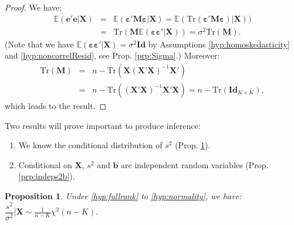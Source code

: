 \documentclass[
  11pt,
]{book}
\providecommand{\tightlist}{%
  \setlength{\itemsep}{0pt}\setlength{\parskip}{0pt}}
\newtheorem{proposition}{Proposition}[chapter]
\theoremstyle{definition}
\theoremstyle{definition}
\theoremstyle{definition}
\theoremstyle{definition}
\theoremstyle{remark}
\begin{document}
\begin{proof}
We have:
\begin{eqnarray*}
\mathbb{E}(\mathbf{e}'\mathbf{e}|\mathbf{X})&=&\mathbb{E}(\boldsymbol{\varepsilon}'\mathbf{M}\boldsymbol{\varepsilon}|\mathbf{X})=\mathbb{E}(\mbox{Tr}(\boldsymbol{\varepsilon}'\mathbf{M}\boldsymbol{\varepsilon})|\mathbf{X}))\\
&=&\mbox{Tr}(\mathbf{M}\mathbb{E}(\boldsymbol{\varepsilon}\boldsymbol{\varepsilon}'|\mathbf{X}))=\sigma^2 \mbox{Tr}(\mathbf{M}).
\end{eqnarray*}
(Note that we have \(\mathbb{E}(\boldsymbol{\varepsilon}\boldsymbol{\varepsilon}'|\mathbf{X})=\sigma^2\mathbf{Id}\) by Assumptions \ref{hyp:homoskedasticity} and \ref{hyp:noncorrelResid}, see Prop. \ref{prp:Sigma}.) Moreover:
\begin{eqnarray*}
\mbox{Tr}(\mathbf{M})&=&n-\mbox{Tr}(\mathbf{X}(\mathbf{X}'\mathbf{X})^{-1}\mathbf{X}')\\
&=&n-\mbox{Tr}((\mathbf{X}'\mathbf{X})^{-1}\mathbf{X}'\mathbf{X})=n-\mbox{Tr}(\mathbf{Id}_{K \times K}),
\end{eqnarray*}
which leads to the result.
\end{proof}

Two results will prove important to produce inference:

\begin{enumerate}
\def\labelenumi{\roman{enumi}.}
\tightlist
\item
  We know the conditional distribution of \(s^2\) (Prop. \ref{prp:s2distri}).
\item
  Conditional on \(\mathbf{X}\), \(s^2\) and \(\mathbf{b}\) are independent random variables (Prop. \ref{prp:indeps2b}).
\end{enumerate}

\begin{proposition}
\protect\hypertarget{prp:s2distri}{}\label{prp:s2distri}Under \ref{hyp:fullrank} to \ref{hyp:normality}, we have: \(\dfrac{s^2}{\sigma^2} | \mathbf{X} \sim \frac{1}{n-K}\chi^2(n-K)\).
\end{proposition}
\end{document}
